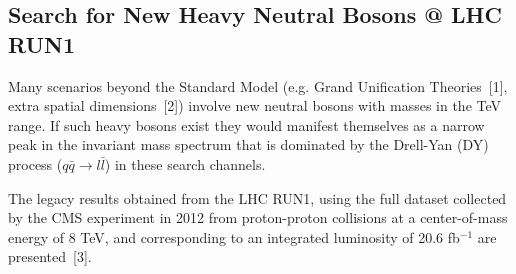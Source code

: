 \documentclass[a0b,portrait,preview]{a0poster}
\begin{document}
\begin{multicols}{3}

\newlength{\figwidth}
\setlength{\figwidth}{25cm}

\newlength{\fighalfwidth}
\setlength{\fighalfwidth}{10cm}



{\red \section{\bf Search for New Heavy Neutral Bosons @ LHC RUN1}}
Many scenarios beyond the Standard Model (e.g. Grand Unification Theories~[1], extra spatial dimensions~[2]) involve new neutral bosons with masses in the TeV range.
If such heavy bosons exist they would manifest themselves as a narrow peak in the invariant mass spectrum that is dominated by the Drell-Yan (DY) process
($q\bar{q}\rightarrow l\bar{l}$) in these search channels.%

 The legacy results obtained from the LHC RUN1, using the full dataset collected by the CMS experiment in 2012 from proton-proton collisions 
at a center-of-mass energy of 8 TeV, and corresponding to an integrated luminosity of 20.6 fb$^{-1}$ are presented~[3].


\end{multicols}
\end{document}
